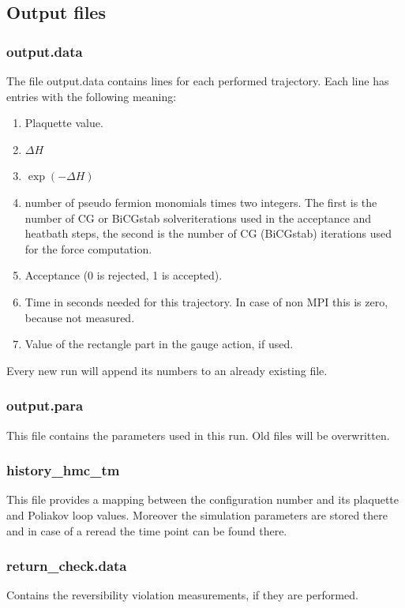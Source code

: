 \subsection{Output files}
\label{sec:output}

\subsubsection*{\ttfamily output.data}

The file {\ttfamily output.data} contains lines for each performed
trajectory. Each line has entries with the following meaning:
\begin{enumerate}
\item Plaquette value.
\item $\Delta H$
\item $\exp(-\Delta H)$
\item number of pseudo fermion monomials times two integers. The first
  is the number of CG or BiCGstab solveriterations used in the acceptance
  and heatbath steps, the second is the number of CG (BiCGstab) iterations 
  used for the force computation.
\item Acceptance (0 is rejected, 1 is accepted).
\item Time in seconds needed for this trajectory. In case of non MPI
  this is zero, because not measured.
\item Value of the rectangle part in the gauge action, if used.
\end{enumerate}
Every new run will append its numbers to an already existing file.

\subsubsection*{\ttfamily output.para}
This file contains the parameters used in this run. Old files will be
overwritten. 

\subsubsection*{\ttfamily history\_hmc\_tm}
This file provides a mapping between the configuration number and its
plaquette and Poliakov loop values. Moreover the simulation parameters
are stored there and in case of a reread the time point can be found there. 

\subsubsection*{\ttfamily return\_check.data}
Contains the reversibility violation measurements, if they are
performed. 

